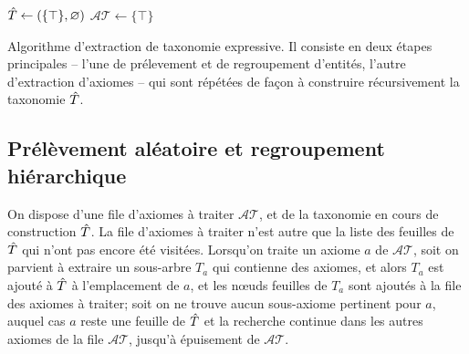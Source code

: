 \begin{algorithm}

$\hat{T} \leftarrow  (\{ \top \}, \varnothing)$ \;
$\mathcal{AT} \leftarrow \{ \top \}$\;

\caption{Algorithme d'extraction de taxonomie expressive. Il consiste en deux étapes principales – l'une de prélevement et de regroupement d'entités, l'autre d'extraction d'axiomes – qui sont répétées de façon à construire récursivement la taxonomie $\hat{T}$.}
\label{algo:texp-main}
\end{algorithm}



\subsection{Prélèvement aléatoire et regroupement hiérarchique}
\label{subsec:texp-clustering}




On dispose d'une file d'axiomes à traiter $\mathcal{AT}$, et de la taxonomie en cours de construction $\hat{T}$. La file d'axiomes à traiter n'est autre que la liste des feuilles de $\hat{T}$ qui n'ont pas encore été visitées. Lorsqu'on traite un axiome $a$ de $\mathcal{AT}$, soit on parvient à extraire un sous-arbre $T_a$ qui contienne des axiomes, et alors $T_a$ est ajouté à $\hat{T}$ à l'emplacement de $a$, et les nœuds feuilles de $T_a$ sont ajoutés à la file des axiomes à traiter; soit on ne trouve aucun sous-axiome pertinent pour $a$, auquel cas $a$ reste une feuille de $\hat{T}$ et la recherche continue dans les autres axiomes de la file $\mathcal{AT}$, jusqu'à épuisement de $\mathcal{AT}$.

